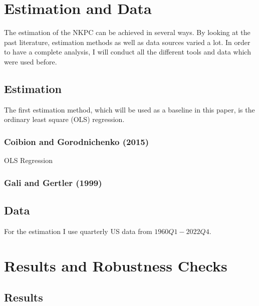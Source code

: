 \documentclass[11pt, a4paper, leqno]{article}
\begin{document}
\section{Estimation and Data} \label{estimation}
The estimation of the NKPC can be achieved in several ways. By looking at the past literature, estimation methods as well as data sources varied a lot. In order to have a complete analysis, I will conduct all the different tools and data which were used before.
\subsection{Estimation}
The first estimation method, which will be used as a baseline in this paper, is the ordinary least square (OLS) regression.
\subsubsection{Coibion and Gorodnichenko (2015)}
OLS Regression

\subsubsection{Gali and Gertler (1999)}

\subsection{Data}
For the estimation I use quarterly US data from $1960Q1-2022Q4$.

\section{Results and Robustness Checks} \label{results}
\subsection{Results}
\end{document}
